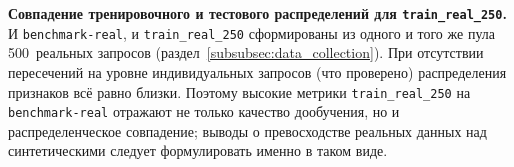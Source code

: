 \textbf{Совпадение тренировочного и тестового распределений для \texttt{train\_real\_250}.} И \texttt{benchmark-real}, и \texttt{train\_real\_250} сформированы из одного и того же пула 500~реальных запросов (раздел~\ref{subsubsec:data_collection}). При отсутствии пересечений на уровне индивидуальных запросов (что проверено) распределения признаков всё равно близки. Поэтому высокие метрики \texttt{train\_real\_250} на \texttt{benchmark-real} отражают не только качество дообучения, но и распределенческое совпадение; выводы о превосходстве реальных данных над синтетическими следует формулировать именно в таком виде.
